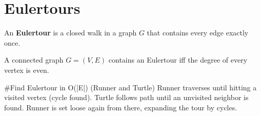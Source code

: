 \section{Eulertours}

\begin{definition}
An \textbf{Eulertour} is a closed walk in a graph $G$ that contains every edge exactly once.
\end{definition}

\begin{theorem}
A connected graph $G = (V, E)$ contains an Eulertour iff the degree of every vertex is even.
\end{theorem}

\begin{algorithm}
#Find Eulertour in O(|E|) (Runner and Turtle)
Runner traverses until hitting a visited vertex (cycle found).
Turtle follows path until an unvisited neighbor is found.
Runner is set loose again from there, expanding the tour by cycles.
\end{algorithm}
